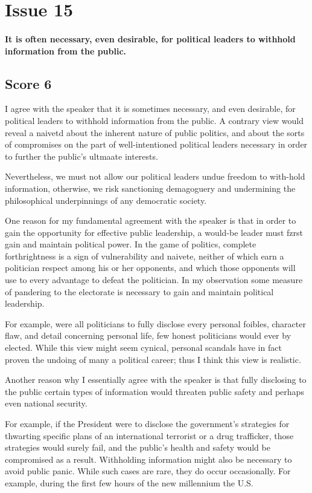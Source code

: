 \section{Issue 15}
\paragraph{
It is often necessary, even desirable, for political leaders to withhold information from the public.
}
\subsection{Score 6}


I agree with the speaker that it is sometimes necessary, and even desirable, for political leaders to withhold information from the public.
A contrary view would reveal a naivetd about the inherent nature of public politics, and about the sorts of compromises on the part of well-intentioned political leaders necessary in order to further the public's ultmaate interests.


Nevertheless, we must not allow our political leaders undue freedom to with-hold information, otherwise, we risk sanctioning demagoguery and undermining the philosophical underpinnings of any democratic society.


One reason for my fundamental agreement with the speaker is that in order to gain the opportunity for effective public leadership, a would-be leader must fzrst gain and maintain political power.
In the game of politics, complete forthrightness is a sign of vulnerability and naivete, neither of which earn a politician respect among his or her opponents, and which those opponents will use to every advantage to defeat the politician.
In my observation some measure of pandering to the electorate is necessary to gain and maintain political leadership.


For example, were all politicians to fully disclose every personal foibles, character flaw, and detail concerning personal life, few honest politicians would ever by elected.
While this view might seem cynical, personal scandals have in fact proven the undoing of many a political career; thus I think this view is realistic.


Another reason why I essentially agree with the speaker is that fully disclosing to the public certain types of information would threaten public safety and perhaps even national security.


For example, if the President were to disclose the government's strategies for thwarting specific plans of an international terrorist or a drug trafficker, those strategies would surely fail, and the public's health and safety would be compromised as a result.
Withholding information might also be necessary to avoid public panic.
While such cases are rare, they do occur occasionally.
For example, during the first few hours of the new millennium the U.S.


